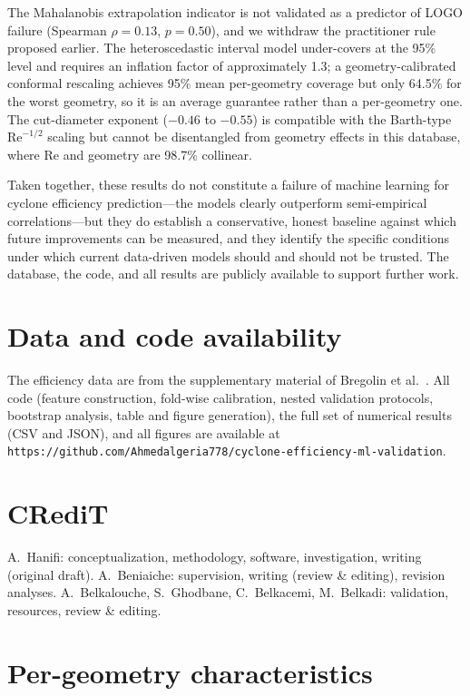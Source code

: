 \documentclass[12pt]{article}
\newcommand{\Rey}{\mathrm{Re}}
\begin{document}
The Mahalanobis extrapolation indicator is not validated as a predictor of LOGO failure (Spearman $\rho = 0.13$, $p = 0.50$), and we withdraw the practitioner rule proposed earlier. The heteroscedastic interval model under-covers at the 95\% level and requires an inflation factor of approximately 1.3; a geometry-calibrated conformal rescaling achieves 95\% mean per-geometry coverage but only 64.5\% for the worst geometry, so it is an average guarantee rather than a per-geometry one. The cut-diameter exponent ($-0.46$ to $-0.55$) is compatible with the Barth-type $\Rey^{-1/2}$ scaling but cannot be disentangled from geometry effects in this database, where Re and geometry are 98.7\% collinear.

Taken together, these results do not constitute a failure of machine learning for cyclone efficiency prediction---the models clearly outperform semi-empirical correlations---but they do establish a conservative, honest baseline against which future improvements can be measured, and they identify the specific conditions under which current data-driven models should and should not be trusted. The database, the code, and all results are publicly available to support further work.

\section*{Data and code availability}
The efficiency data are from the supplementary material of Bregolin et al.\ \cite{bregolin}. All code (feature construction, fold-wise calibration, nested validation protocols, bootstrap analysis, table and figure generation), the full set of numerical results (CSV and JSON), and all figures are available at\\
\texttt{https://github.com/Ahmedalgeria778/cyclone-efficiency-ml-validation}.

\section*{CRediT}
A.~Hanifi: conceptualization, methodology, software, investigation, writing (original draft). A.~Beniaiche: supervision, writing (review \& editing), revision analyses. A.~Belkalouche, S.~Ghodbane, C.~Belkacemi, M.~Belkadi: validation, resources, review \& editing.

\appendix
\section{Per-geometry characteristics}

\end{document}
